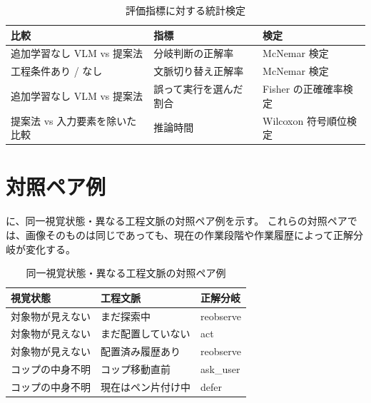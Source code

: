 \begin{table}[tbp]
\centering
\caption{評価指標に対する統計検定}
\label{tab:stats}
\begin{tabularx}{\linewidth}{lXl}
\toprule
比較 & 指標 & 検定 \\
\midrule
追加学習なし VLM vs 提案法 & 分岐判断の正解率 & McNemar 検定 \\
工程条件あり / なし & 文脈切り替え正解率 & McNemar 検定 \\
追加学習なし VLM vs 提案法 & 誤って実行を選んだ割合 & Fisher の正確確率検定 \\
提案法 vs 入力要素を除いた比較 & 推論時間 & Wilcoxon 符号順位検定 \\
\bottomrule
\end{tabularx}
\end{table}

\section{対照ペア例}

 に、同一視覚状態・異なる工程文脈の対照ペア例を示す。
これらの対照ペアでは、画像そのものは同じであっても、現在の作業段階や作業履歴によって正解分岐が変化する。

\begin{table}[tbp]
\centering
\caption{同一視覚状態・異なる工程文脈の対照ペア例}
\label{tab:contrast_pairs}
\begin{tabularx}{\linewidth}{XXl}
\toprule
視覚状態 & 工程文脈 & 正解分岐 \\
\midrule
対象物が見えない & まだ探索中 & reobserve \\
対象物が見えない & まだ配置していない & act \\
対象物が見えない & 配置済み履歴あり & reobserve \\
コップの中身不明 & コップ移動直前 & ask\_user \\
コップの中身不明 & 現在はペン片付け中 & defer \\
\bottomrule
\end{tabularx}
\end{table}